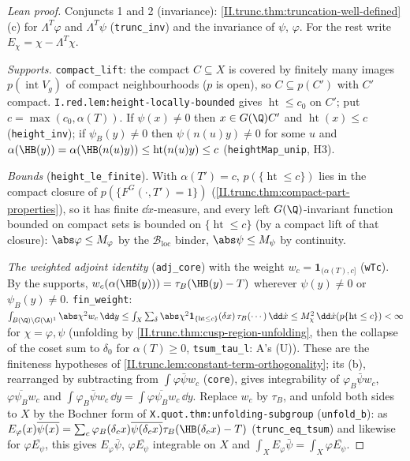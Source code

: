 \begin{proof}[Lean proof]
Conjuncts 1 and 2 (invariance): \cref{II.trunc.thm:truncation-well-defined}(c) for $\Lambda^T\varphi$ and $\Lambda^T\psi$ (\texttt{trunc\_inv}) and the invariance of $\psi$, $\varphi$. For the rest write $E_\chi=\chi-\Lambda^T\chi$.

\emph{Supports.} \texttt{compact\_lift}: the compact $C\subseteq X$ is covered by finitely many images $p(\operatorname{int}V_g)$ of compact neighbourhoods ($p$ is open), so $C\subseteq p(C')$ with $C'$ compact. \texttt{I.red.lem:height-locally-bounded} gives $\operatorname{ht}\le c_0$ on $C'$; put $c=\max(c_0,\alpha(T))$. If $\psi(x)\ne0$ then $x\in G(\Q)C'$ and $\operatorname{ht}(x)\le c$ (\texttt{height\_inv}); if $\psi_B(y)\ne0$ then $\psi(n(u)y)\ne0$ for some $u$ and $\alpha(\HB(y))=\alpha(\HB(n(u)y))\le\operatorname{ht}(n(u)y)\le c$ (\texttt{heightMap\_unip}, H3).

\emph{Bounds} (\texttt{height\_le\_finite}). With $\alpha(T')=c$, $p(\{\operatorname{ht}\le c\})$ lies in the compact closure of $p(\{F^G(\cdot,T')=1\})$ (\cref{II.trunc.thm:compact-part-properties}), so it has finite $\dd\dot x$-measure, and every left $G(\Q)$-invariant function bounded on compact sets is bounded on $\{\operatorname{ht}\le c\}$ (by a compact lift of that closure): $\abs\varphi\le M_\varphi$ by the $\mathcal B_{\mathrm{loc}}$ binder, $\abs\psi\le M_\psi$ by continuity.

\emph{The weighted adjoint identity} (\texttt{adj\_core}) with the weight $w_c=\mathbf 1_{(\alpha(T),c]}$ (\texttt{wTc}). By the supports, $w_c(\alpha(\HB(y)))=\tau_B(\HB(y)-T)$ wherever $\psi(y)\ne0$ or $\psi_B(y)\ne0$. \texttt{fin\_weight}: $\int_{B(\Q)\backslash G(\A)^1}\abs\chi^2w_c\,\dd y\le\int_X\sum_\delta\abs\chi^2\mathbf 1_{\{\operatorname{ht}\le c\}}(\delta x)\,\tau_B(\cdots)\,\dd\dot x\le M_\chi^2\,\dd\dot x(p\{\operatorname{ht}\le c\})<\infty$ for $\chi=\varphi,\psi$ (unfolding by \cref{II.trunc.thm:cusp-region-unfolding}, then the collapse of the coset sum to $\delta_0$ for $\alpha(T)\ge0$, \texttt{tsum\_tau\_l}: A's (U)). These are the finiteness hypotheses of \cref{II.trunc.lem:constant-term-orthogonality}; its (b), rearranged by subtracting from $\int\varphi\bar\psi w_c$ (\texttt{core}), gives integrability of $\varphi_B\bar\psi w_c$, $\varphi\overline{\psi_B}w_c$ and $\int\varphi_B\bar\psi w_c\,\dd y=\int\varphi\overline{\psi_B}w_c\,\dd y$. Replace $w_c$ by $\tau_B$, and unfold both sides to $X$ by the Bochner form of \texttt{X.quot.thm:unfolding-subgroup} (\texttt{unfold\_b}): as $E_\varphi(x)\overline{\psi(x)}=\sum_c\varphi_B(\delta_cx)\overline{\psi(\delta_cx)}\tau_B(\HB(\delta_cx)-T)$ (\texttt{trunc\_eq\_tsum}) and likewise for $\varphi\overline{E_\psi}$, this gives $E_\varphi\bar\psi$, $\varphi\overline{E_\psi}$ integrable on $X$ and $\int_XE_\varphi\bar\psi=\int_X\varphi\overline{E_\psi}$.


\end{proof}
